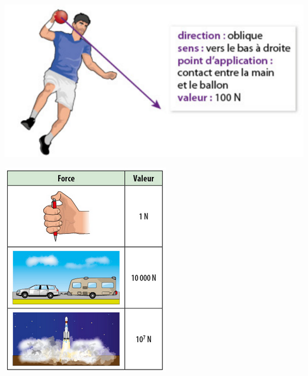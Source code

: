 \documentclass[12pt,a4paper]{article}
\begin{document}
\begin{multicols}{2}
	\begin{center}
		\includegraphics[scale=0.6]{ex_force}
	\end{center}
	
	\begin{center}
		\includegraphics[scale=0.6]{og_valeurs}
	\end{center}
\end{multicols}
\end{document}
